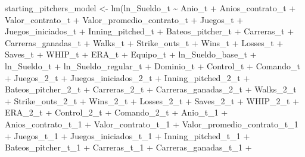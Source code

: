 \documentclass[
]{article}
\newenvironment{Shaded}{\begin{snugshade}}{\end{snugshade}}
\newcommand{\FunctionTok}[1]{\textcolor[rgb]{0.00,0.00,0.00}{#1}}
\newcommand{\NormalTok}[1]{#1}
\newcommand{\OtherTok}[1]{\textcolor[rgb]{0.56,0.35,0.01}{#1}}
\newcommand{\SpecialCharTok}[1]{\textcolor[rgb]{0.00,0.00,0.00}{#1}}
\begin{document}
\begin{Shaded}
\begin{Highlighting}[]
\NormalTok{starting\_pitchers\_model }\OtherTok{\textless{}{-}} \FunctionTok{lm}\NormalTok{(ln\_Sueldo\_t }\SpecialCharTok{\textasciitilde{}}\NormalTok{ Anio\_t }\SpecialCharTok{+}\NormalTok{ Anios\_contrato\_t }\SpecialCharTok{+}\NormalTok{ Valor\_contrato\_t }\SpecialCharTok{+}\NormalTok{ Valor\_promedio\_contrato\_t }\SpecialCharTok{+} 
\NormalTok{Juegos\_t }\SpecialCharTok{+}\NormalTok{ Juegos\_iniciados\_t }\SpecialCharTok{+}\NormalTok{ Inning\_pitched\_t }\SpecialCharTok{+}\NormalTok{ Bateos\_pitcher\_t }\SpecialCharTok{+}\NormalTok{ Carreras\_t }\SpecialCharTok{+}       
\NormalTok{Carreras\_ganadas\_t }\SpecialCharTok{+}\NormalTok{  Walks\_t }\SpecialCharTok{+}\NormalTok{ Strike\_outs\_t }\SpecialCharTok{+}\NormalTok{  Wins\_t }\SpecialCharTok{+}\NormalTok{ Losses\_t  }\SpecialCharTok{+}\NormalTok{ Saves\_t }\SpecialCharTok{+}\NormalTok{ WHIP\_t }\SpecialCharTok{+} 
\NormalTok{ERA\_t }\SpecialCharTok{+}\NormalTok{ Equipo\_t }\SpecialCharTok{+}\NormalTok{ ln\_Sueldo\_base\_t }\SpecialCharTok{+}\NormalTok{ ln\_Sueldo\_t }\SpecialCharTok{+}\NormalTok{ ln\_Sueldo\_regular\_t  }\SpecialCharTok{+}\NormalTok{ Dominio\_t }\SpecialCharTok{+}\NormalTok{ Control\_t }\SpecialCharTok{+}\NormalTok{ Comando\_t }\SpecialCharTok{+}           
\NormalTok{Juegos\_2\_t }\SpecialCharTok{+}\NormalTok{ Juegos\_iniciados\_2\_t }\SpecialCharTok{+}\NormalTok{ Inning\_pitched\_2\_t }\SpecialCharTok{+}\NormalTok{ Bateos\_pitcher\_2\_t }\SpecialCharTok{+}\NormalTok{ Carreras\_2\_t }\SpecialCharTok{+}    
\NormalTok{Carreras\_ganadas\_2\_t }\SpecialCharTok{+}\NormalTok{ Walks\_2\_t }\SpecialCharTok{+}\NormalTok{ Strike\_outs\_2\_t  }\SpecialCharTok{+}\NormalTok{ Wins\_2\_t }\SpecialCharTok{+}\NormalTok{ Losses\_2\_t  }\SpecialCharTok{+}\NormalTok{ Saves\_2\_t }\SpecialCharTok{+}\NormalTok{ WHIP\_2\_t  }\SpecialCharTok{+}
\NormalTok{ERA\_2\_t }\SpecialCharTok{+}\NormalTok{ Control\_2\_t }\SpecialCharTok{+}\NormalTok{ Comando\_2\_t }\SpecialCharTok{+}\NormalTok{ Anio\_t\_1 }\SpecialCharTok{+}\NormalTok{ Anios\_contrato\_t\_1 }\SpecialCharTok{+}\NormalTok{ Valor\_contrato\_t\_1 }\SpecialCharTok{+}\NormalTok{ Valor\_promedio\_contrato\_t\_1 }\SpecialCharTok{+} 
\NormalTok{Juegos\_t\_1 }\SpecialCharTok{+}\NormalTok{ Juegos\_iniciados\_t\_1  }\SpecialCharTok{+}\NormalTok{ Inning\_pitched\_t\_1 }\SpecialCharTok{+}\NormalTok{ Bateos\_pitcher\_t\_1 }\SpecialCharTok{+}\NormalTok{ Carreras\_t\_1 }\SpecialCharTok{+}\NormalTok{ Carreras\_ganadas\_t\_1  }\SpecialCharTok{+}   

\end{Highlighting}
\end{Shaded}
\end{document}
